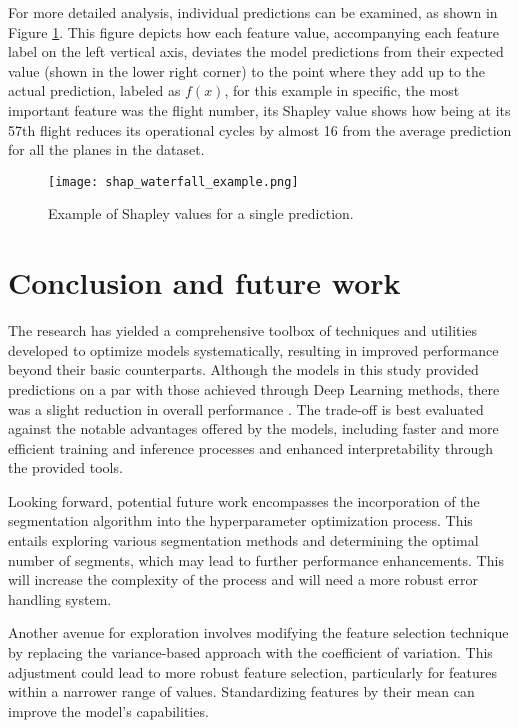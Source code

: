 \documentclass{IEEEtran}
\begin{document}
            For more detailed analysis, individual predictions can be examined, as shown in Figure \ref{fig:shap_instance}. This figure depicts how each feature value, accompanying each feature label on the left vertical axis, deviates the model predictions from their expected value (shown in the lower right corner) to the point where they add up to the actual prediction, labeled as $f(x)$, for this example in specific, the most important feature was the flight number, its Shapley value shows how being at its 57th flight reduces its operational cycles by almost 16 from the average prediction for all the planes in the dataset.
            \begin{figure}[H]
                \centering
                \texttt{[image: shap\_waterfall\_example.png]}
                \caption{Example of Shapley values for a single prediction.}
                \label{fig:shap_instance}
            \end{figure}

    \section{Conclusion and future work} \label{sec:conclusion}

        The research has yielded a comprehensive toolbox of techniques and utilities developed to optimize models systematically, resulting in improved performance beyond their basic counterparts. Although the models in this study provided predictions on a par with those achieved through Deep Learning methods, there was a slight reduction in overall performance \cite{phm-leaderboard}. The trade-off is best evaluated against the notable advantages offered by the models, including faster and more efficient training and inference processes and enhanced interpretability through the provided tools.

        Looking forward, potential future work encompasses the incorporation of the segmentation algorithm into the hyperparameter optimization process. This entails exploring various segmentation methods and determining the optimal number of segments, which may lead to further performance enhancements. This will increase the complexity of the process and will need a more robust error handling system.

        Another avenue for exploration involves modifying the feature selection technique by replacing the variance-based approach with the coefficient of variation. This adjustment could lead to more robust feature selection, particularly for features within a narrower range of values. Standardizing features by their mean can improve the model's capabilities.
\end{document}
